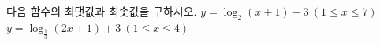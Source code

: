 다음 함수의 최댓값과 최솟값을 구하시오.
 $y=\log_2 (x+1)-3\ (1\le x\le 7)$
 $y=\log_{\frac{1}{3}} (2x+1)+3\ (1\le x\le 4)$
